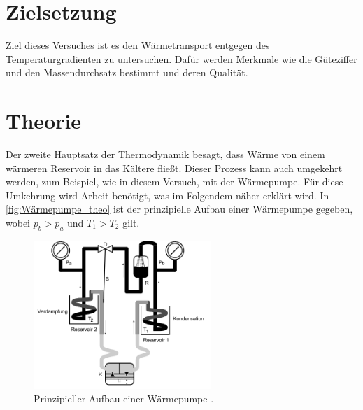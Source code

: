\section{Zielsetzung}
\label{sec:Zielsetzung}
Ziel dieses Versuches ist es den Wärmetransport entgegen des Temperaturgradienten zu untersuchen. 
Dafür werden Merkmale wie die Güteziffer und den Massendurchsatz bestimmt und deren Qualität.

\section{Theorie}
\label{sec:Theorie}
Der zweite Hauptsatz der Thermodynamik besagt, dass Wärme von einem wärmeren Reservoir in das Kältere fließt.
Dieser Prozess kann auch umgekehrt werden, zum Beispiel, wie in diesem Versuch, mit der Wärmepumpe.
Für diese Umkehrung wird Arbeit benötigt, was im Folgendem näher erklärt wird. 
In \autoref{fig:Wärmepumpe_theo} ist der prinzipielle Aufbau einer Wärmepumpe gegeben, wobei $p_b>p_a$ und $T_1>T_2$ gilt.
\begin{figure}[H]
    \centering
    \includegraphics[width=0.6\textwidth]{build/Abb1.png}
    \caption{Prinzipieller Aufbau einer Wärmepumpe \cite[196]{V206}.}
    \label{fig:Wärmepumpe_theo}
\end{figure}


